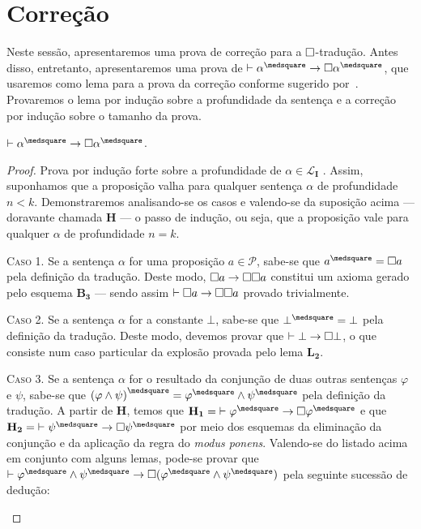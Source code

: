 \section{Correção}

    Neste sessão, apresentaremos uma prova de correção para a $\Box$-tradução. Antes disso, entretanto, apresentaremos uma prova de $\entails\alpha^\medsquare\to\nec\alpha^\medsquare$, que usaremos como lema para a prova da correção conforme sugerido por~\cite{Troelstra}. Provaremos o lema por indução sobre a profundidade da sentença e a correção por indução sobre o tamanho da prova.

    \begin{lemma}\label{square-nec}
        $\entails\alpha^\medsquare\to\nec\alpha^\medsquare$.

        \begin{proof}
            Prova por indução forte sobre a profundidade de $\alpha\in\mathcal{L}_\mathbf{I}$ \citep{Troelstra}.
            Assim, suponhamos que a proposição valha para qualquer sentença $\alpha$ de profundidade $n<k$.
            Demonstraremos analisando-se os casos e valendo-se da suposição acima --- doravante chamada $\mathbf{H}$ --- o passo de indução, ou seja, que a proposição vale para qualquer $\alpha$ de profundidade $n=k$.

            \begin{case}
                \textsc{Caso 1.}
                Se a sentença $\alpha$ for uma proposição $a\in\mathcal{P}$, sabe-se que $a^\medsquare=\nec a$ pela definição da tradução.
                Deste modo, $\Box{a}\to\Box\Box{a}$ constitui um axioma gerado pelo esquema \hyperref[MB3]{$\mathbf{B_3}$} --- sendo assim $\mathrel{\vdash}\Box{a}\to\Box\Box{a}$ provado trivialmente.
            \end{case}

            \begin{case}
                \textsc{Caso 2.}
                Se a sentença $\alpha$ for a constante $\bot$, sabe-se que $\bot^\medsquare=\bot$ pela definição da tradução.
                Deste modo, devemos provar que $\mathrel{\vdash}\bot\to\Box\bot$, o que consiste num caso particular da explosão provada pelo lema \hyperref[explosion]{$\mathbf{L_2}$}.
            \end{case}

            \begin{case}
                \textsc{Caso 3.}
                Se a sentença $\alpha$ for o resultado da conjunção de duas outras sentenças $\varphi$ e $\psi$, sabe-se que ${(\varphi\wedge\psi)}^\medsquare=\varphi^\medsquare\wedge\psi^\medsquare$ pela definição da tradução.
                A partir de $\mathbf{H}$, temos que $\mathbf{H_1}={\entails\varphi^\medsquare\to\nec\varphi^\medsquare}$ e que $\mathbf{H_2}={\entails\psi^\medsquare\to\nec\psi^\medsquare}$ por meio dos esquemas da eliminação da conjunção e da aplicação da regra do \emph{modus ponens}.
                Valendo-se do listado acima em conjunto com alguns lemas, pode-se provar que $\entails\varphi^\medsquare\wedge\psi^\medsquare\to\nec(\varphi^\medsquare\wedge\psi^\medsquare)$ pela seguinte sucessão de dedução:


\end{case}
\end{proof}
\end{lemma}
